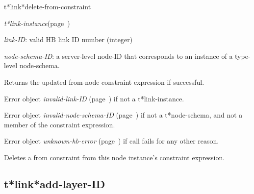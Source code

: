 \begin{description}
\item [Name:]  t*link*delete-from-constraint

\item [Class:] {\sl t*link-instance}\hfill(page~\pageref{t*link-instance})

\item [Parameters:]
\item {\sl link-ID}:  
valid HB link ID number (integer)

\item {\sl node-schema-ID}:  a server-level node-ID that corresponds to an 
instance of a type-level node-schema. 



\item [Return-value:]
Returns the updated from-node constraint expression
if successful.

Error object {\sl invalid-link-ID} (page~\pageref{invalid-link-ID}) if not a t*link-instance.

Error object {\sl invalid-node-schema-ID} (page~\pageref{invalid-node-schema-ID}) if not
a t*node-schema, and not a member of the constraint
expression.

Error object {\sl unknown-hb-error} (page~\pageref{unknown-hb-error}) if call fails for
any other reason.

\item [Description:]

Deletes a from constraint from this node instance's
constraint expression.

\item [Public:]



\end{description}
\horizontalline

\subsection{t*link*add-layer-ID}
\label{t*link*add-layer-ID}

